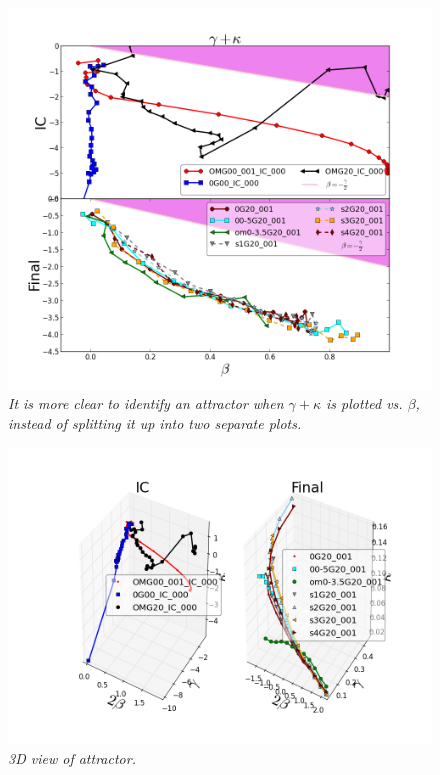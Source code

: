 \begin{figure}[h!]
	\centering
		\includegraphics[width=1.0\linewidth]{img/Attractor_fig3.png}
		{\medskip\caption{\textsl{It is more clear to identify an attractor when $\gamma + \kappa$ is plotted vs. $\beta$, instead of splitting it up into two separate plots.
\label{fig:Rv}}}}
\end{figure} 

\begin{figure}[h!]
	\centering
		\includegraphics[width=1.0\linewidth]{img/Attractor_3D.png}
		{\medskip\caption{\textsl{3D view of attractor.
\label{fig:Rv}}}}
\end{figure} 

